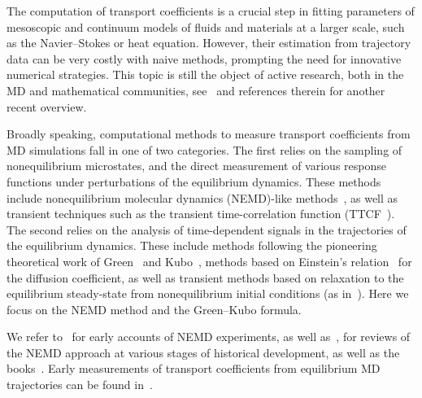 The computation of transport coefficients is a crucial step in fitting parameters of mesoscopic and continuum models of fluids and materials at a larger scale, such as the Navier--Stokes or heat equation. However, their estimation from trajectory data can be very costly with naive methods, prompting the need for innovative numerical strategies. This topic is still the object of active research, both in the MD and mathematical communities, see~\cite{S24} and references therein for another recent overview.

Broadly speaking, computational methods to measure transport coefficients from MD simulations fall in one of two categories. The first relies on the sampling of nonequilibrium microstates,  and the direct measurement of various response functions under perturbations of the equilibrium dynamics. These methods include nonequilibrium molecular dynamics (NEMD)-like methods~\cite{CJ75}, as well as transient techniques such as the transient time-correlation function (TTCF~\cite{ME87}).
The second relies on the analysis of time-dependent signals in the trajectories of the equilibrium dynamics. These include methods following the pioneering theoretical work of Green~\cite{G54} and Kubo~\cite{K57a,K57b}, methods based on Einstein's relation~\cite{E05,R89} for the diffusion coefficient, as well as transient methods based on relaxation to the equilibrium steady-state from nonequilibrium initial conditions (as in~\cite{AMC00,LPFC13}). Here we focus on the NEMD method and the Green--Kubo formula.

We refer to~\cite{CJ75,CJMD76} for early accounts of NEMD experiments, as well as~\cite{CJMD79,H93,CKS05,CF16},\cite[Chapter 4]{H86} for reviews of the NEMD approach at various stages of historical development, as well as the books~\cite{EM08,TD17}. Early measurements of transport coefficients from equilibrium MD trajectories can be found in~\cite{AGW70,LV70,LVK73}. 


